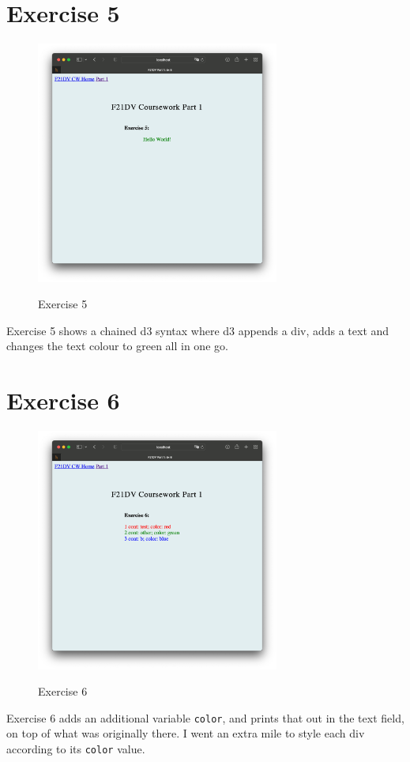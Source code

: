 \documentclass{scrreprt}
\begin{document}
\newpage
\section{Exercise 5}
\begin{figure}[!ht]
    \centering
    \includegraphics[width = 8cm]{images/ex5.png}
    \label{fig:ex5}
    \caption{Exercise 5}
\end{figure}
\FloatBarrier

Exercise 5 shows a chained d3 syntax where d3 appends a div, adds a text and changes the text colour
to green all in one go.

\newpage
\section{Exercise 6}
\begin{figure}[!ht]
    \centering
    \includegraphics[width = 8cm]{images/ex6.png}
    \label{fig:ex6}
    \caption{Exercise 6}
\end{figure}
\FloatBarrier

Exercise 6 adds an additional variable \verb|color|, and prints that out in the text field, on top of
what was originally there. I went an extra mile to style each div according to its \verb|color| value.
\end{document}
